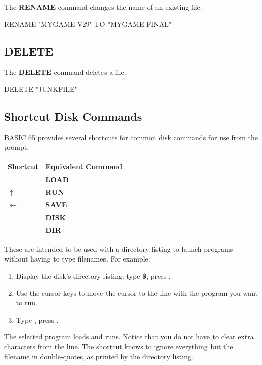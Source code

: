 The {\bf RENAME} command changes the name of an existing file.

\begin{screencode}
RENAME "MYGAME-V29" TO "MYGAME-FINAL"
\end{screencode}

\subsection{DELETE}

The {\bf DELETE} command deletes a file.

\begin{screencode}
DELETE "JUNKFILE"
\end{screencode}


\subsection{Shortcut Disk Commands}

BASIC 65 provides several shortcuts for common disk commands for use from the  prompt.

\begin{center}
\begin{tabular}{|l|l|}
\hline
{\bf Shortcut} & {\bf Equivalent Command} \\
\hline
\screentextwide{/} & {\bf LOAD} \\
\hline
$\uparrow$ & {\bf RUN} \\
\hline
$\leftarrow$ & {\bf SAVE} \\
\hline
\screentextwide{@} & {\bf DISK} \\
\hline
\screentextwide{\$} & {\bf DIR} \\
\hline
\end{tabular}
\end{center}

These are intended to be used with a directory listing to launch programs without having to type filenames. For example:

\begin{enumerate}
\item Display the disk's directory listing: type {\bf \$}, press .
\item Use the cursor keys to move the cursor to the line with the program you want to run.
\item Type {\bf \screentext{$\uparrow$}}, press .
\end{enumerate}

The selected program loads and runs. Notice that you do not have to clear extra characters from the line. The shortcut knows to ignore everything but the filename in double-quotes, as printed by the directory listing.
